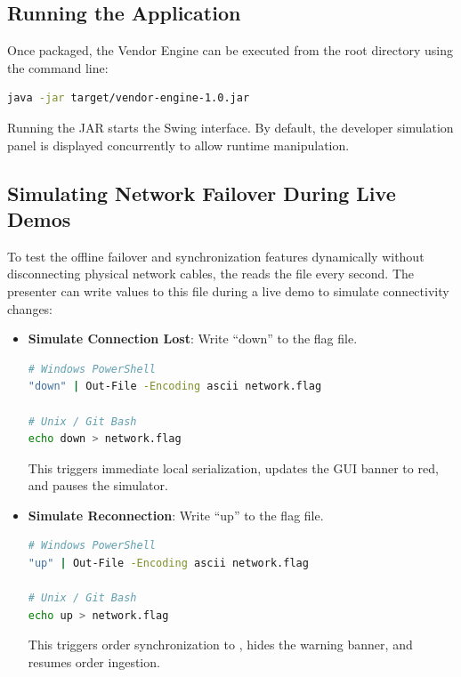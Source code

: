 \subsection{Running the Application}
Once packaged, the Vendor Engine can be executed from the root directory using the command line:
\begin{lstlisting}[language=bash]
java -jar target/vendor-engine-1.0.jar
\end{lstlisting}
Running the JAR starts the Swing  interface. By default, the developer simulation panel is displayed concurrently to allow runtime manipulation.

\subsection{Simulating Network Failover During Live Demos}
To test the offline failover and synchronization features dynamically without disconnecting physical network cables, the  reads the  file every second. 
The presenter can write values to this file during a live demo to simulate connectivity changes:
\begin{itemize}
    \item \textbf{Simulate Connection Lost}: Write ``down'' to the flag file.
    \begin{lstlisting}[language=bash]
# Windows PowerShell
"down" | Out-File -Encoding ascii network.flag

# Unix / Git Bash
echo down > network.flag
    \end{lstlisting}
    This triggers immediate local serialization, updates the GUI banner to red, and pauses the simulator.
    \item \textbf{Simulate Reconnection}: Write ``up'' to the flag file.
    \begin{lstlisting}[language=bash]
# Windows PowerShell
"up" | Out-File -Encoding ascii network.flag

# Unix / Git Bash
echo up > network.flag
    \end{lstlisting}
    This triggers order synchronization to , hides the warning banner, and resumes order ingestion.
\end{itemize}

